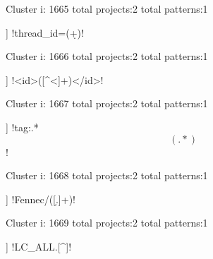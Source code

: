 Cluster i: 1665
total projects:2
total patterns:1
\begin{multicols}{1}
\begin{description}[noitemsep,topsep=0pt]
\item [[2] ] \cverb!thread_id=(\d+)!
\end{description}
\end{multicols}







Cluster i: 1666
total projects:2
total patterns:1
\begin{multicols}{1}
\begin{description}[noitemsep,topsep=0pt]
\item [[2] ] \cverb!<id>([^<]+)</id>!
\end{description}
\end{multicols}







Cluster i: 1667
total projects:2
total patterns:1
\begin{multicols}{1}
\begin{description}[noitemsep,topsep=0pt]
\item [[2] ] \cverb!tag:.*\[(.*)\]!
\end{description}
\end{multicols}







Cluster i: 1668
total projects:2
total patterns:1
\begin{multicols}{1}
\begin{description}[noitemsep,topsep=0pt]
\item [[2] ] \cverb!Fennec/([\d.]+)!
\end{description}
\end{multicols}







Cluster i: 1669
total projects:2
total patterns:1
\begin{multicols}{1}
\begin{description}[noitemsep,topsep=0pt]
\item [[2] ] \cverb!LC_ALL.[^\s]\s!
\end{description}
\end{multicols}







